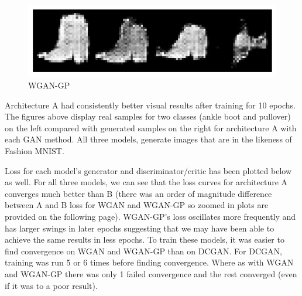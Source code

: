 \documentclass{article}
\begin{document}
\begin{figure}[ht]
{\begin{minipage}[t]{0.45\textwidth}
        \includegraphics[width=\textwidth]{../src/gp_boot.png}
        \caption{WGAN-GP}
        \label{fig:image3}
    \end{minipage}  
    }
\end{figure}

Architecture A had consistently better visual results after training for 10 epochs. The figures above display real samples for two classes (ankle boot and pullover) on the left compared with generated samples on the right for architecture A with each
GAN method. All three models, generate images that are in the likeness of Fashion MNIST.  

Loss for each model's generator and discriminator/critic has been plotted below as well.
For all three models, we can see that the loss curves for architecture A converges much better than B (there was an order of magnitude difference between A
and B loss for WGAN and WGAN-GP so zoomed in plots are provided on the following page). WGAN-GP's loss oscillates more frequently and has larger swings in later epochs suggesting
that we may have been able to achieve the same results in less epochs. To train these models, it was easier to find convergence on WGAN and WGAN-GP than on DCGAN. For DCGAN,
training was run 5 or 6 times before finding convergence. Where as with WGAN and WGAN-GP there was only 1 failed convergence and the rest converged (even if it was to a poor result).
\end{document}
